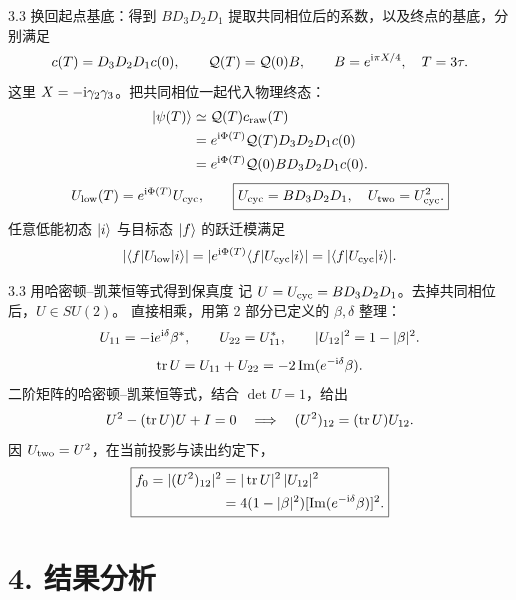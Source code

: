 \documentclass[aspectratio=169,11pt]{beamer}
\begin{document}
\begin{frame}[t]{3.3 换回起点基底：得到 $BD_3D_2D_1$}
  \small
  \setlength{\abovedisplayskip}{5pt}\setlength{\belowdisplayskip}{5pt}
  提取共同相位后的系数，以及终点的基底，分别满足
  \[
    c(T)=D_3D_2D_1c(0),\qquad
    \mathcal Q(T)=\mathcal Q(0)B,\qquad B=e^{\mathrm{i}\pi X/4},\quad T=3\tau.
  \]
  这里 $X=-\mathrm{i}\gamma_2\gamma_3$。把共同相位一起代入物理终态：
  \[
  \begin{aligned}
    \lvert \psi(T)\rangle&\simeq\mathcal Q(T)c_{\rm raw}(T)\\
                &=e^{\mathrm{i}\Phi(T)}\mathcal Q(T)D_3D_2D_1c(0)\\
                &=e^{\mathrm{i}\Phi(T)}\mathcal Q(0)BD_3D_2D_1c(0).
  \end{aligned}
  \]
  \[
    U_{\rm low}(T)=e^{\mathrm{i}\Phi(T)}U_{\rm cyc},\qquad
    \boxed{U_{\rm cyc}=BD_3D_2D_1,\quad U_{\rm two}=U_{\rm cyc}^2.}
  \]
  任意低能初态 $\lvert i\rangle$ 与目标态 $\lvert f\rangle$ 的跃迁模满足
  \[
    |\langle f\rvert U_{\rm low}\lvert i\rangle|=|e^{\mathrm{i}\Phi(T)}\langle f\rvert U_{\rm cyc}\lvert i\rangle|
    =|\langle f\rvert U_{\rm cyc}\lvert i\rangle|.
  \]
\end{frame}

\begin{frame}[t]{3.3 用哈密顿--凯莱恒等式得到保真度}
  \small
  \setlength{\abovedisplayskip}{5pt}\setlength{\belowdisplayskip}{5pt}
  记 $U=U_{\rm cyc}=BD_3D_2D_1$。去掉共同相位后，$U\in SU(2)$。
  直接相乘，用第 2 部分已定义的 $\beta,\delta$ 整理：
  \[
    U_{11}=-\mathrm{i} e^{\mathrm{i}\delta}\beta^*,\qquad U_{22}=U_{11}^*,\qquad
    |U_{12}|^2=1-|\beta|^2.
  \]
  \[
    \operatorname{tr} U=U_{11}+U_{22}=-2\operatorname{Im}(e^{-\mathrm{i}\delta}\beta).
  \]
  二阶矩阵的哈密顿--凯莱恒等式，结合 $\det U=1$，给出
  \[
    U^2-(\operatorname{tr} U)U+I=0
    \quad\Longrightarrow\quad (U^2)_{12}=(\operatorname{tr} U)U_{12}.
  \]
  因 $U_{\rm two}=U^2$，在当前投影与读出约定下，
  \[
    \boxed{\begin{aligned}
      f_0=|(U^2)_{12}|^2
         &=|\operatorname{tr} U|^2\,|U_{12}|^2\\
         &=4(1-|\beta|^2)[\operatorname{Im}(e^{-\mathrm{i}\delta}\beta)]^2.
    \end{aligned}}
  \]
\end{frame}

\section{4. 结果分析}
\end{document}

